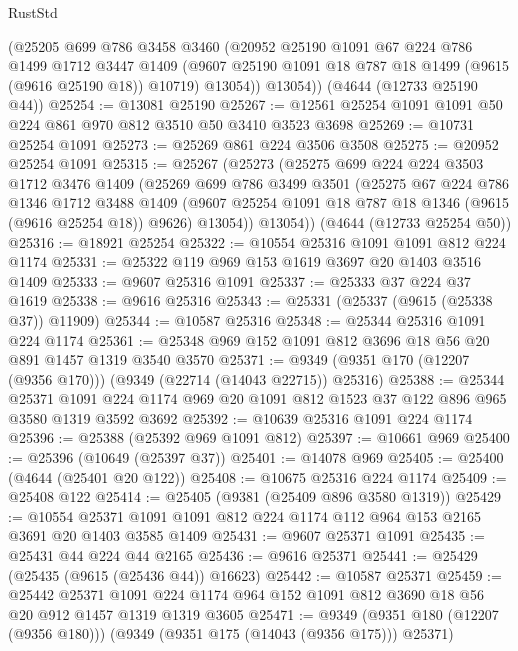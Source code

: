 \begin{lexlean}{RustStd}
\begin{coremodule}
        (@25205
          @699
          @786
          @3458
          @3460
          (@20952
            @25190
            @1091
            @67
            @224
            @786
            @1499
            @1712
            @3447
            @1409
            (@9607 @25190 @1091 @18 @787 @18 @1499 (@9615 (@9616 @25190 @18)) @10719)
            @13054))
        @13054))
    (@4644 (@12733 @25190 @44))
@25254 := @13081 @25190
@25267 := @12561 @25254 @1091 @1091 @50 @224 @861 @970 @812 @3510 @50 @3410 @3523 @3698
@25269 := @10731 @25254 @1091
@25273 := @25269 @861 @224 @3506 @3508
@25275 := @20952 @25254 @1091
@25315 := @25267
    (@25273
      (@25275
        @699
        @224
        @224
        @3503
        @1712
        @3476
        @1409
        (@25269
          @699
          @786
          @3499
          @3501
          (@25275
            @67
            @224
            @786
            @1346
            @1712
            @3488
            @1409
            (@9607 @25254 @1091 @18 @787 @18 @1346 (@9615 (@9616 @25254 @18)) @9626)
            @13054))
        @13054))
    (@4644 (@12733 @25254 @50))
@25316 := @18921 @25254
@25322 := @10554 @25316 @1091 @1091 @812 @224 @1174
@25331 := @25322 @119 @969 @153 @1619 @3697 @20 @1403 @3516 @1409
@25333 := @9607 @25316 @1091
@25337 := @25333 @37 @224 @37 @1619
@25338 := @9616 @25316
@25343 := @25331 (@25337 (@9615 (@25338 @37)) @11909)
@25344 := @10587 @25316
@25348 := @25344 @25316 @1091 @224 @1174
@25361 := @25348 @969 @152 @1091 @812 @3696 @18 @56 @20 @891 @1457 @1319 @3540 @3570
@25371 := @9349 (@9351 @170 (@12207 (@9356 @170))) (@9349 (@22714 (@14043 @22715)) @25316)
@25388 := @25344
    @25371
    @1091
    @224
    @1174
    @969
    @20
    @1091
    @812
    @1523
    @37
    @122
    @896
    @965
    @3580
    @1319
    @3592
    @3692
@25392 := @10639 @25316 @1091 @224 @1174
@25396 := @25388 (@25392 @969 @1091 @812)
@25397 := @10661 @969
@25400 := @25396 (@10649 (@25397 @37))
@25401 := @14078 @969
@25405 := @25400 (@4644 (@25401 @20 @122))
@25408 := @10675 @25316 @224 @1174
@25409 := @25408 @122
@25414 := @25405 (@9381 (@25409 @896 @3580 @1319))
@25429 := @10554 @25371 @1091 @1091 @812 @224 @1174 @112 @964 @153 @2165 @3691 @20 @1403 @3585 @1409
@25431 := @9607 @25371 @1091
@25435 := @25431 @44 @224 @44 @2165
@25436 := @9616 @25371
@25441 := @25429 (@25435 (@9615 (@25436 @44)) @16623)
@25442 := @10587 @25371
@25459 := @25442
    @25371
    @1091
    @224
    @1174
    @964
    @152
    @1091
    @812
    @3690
    @18
    @56
    @20
    @912
    @1457
    @1319
    @1319
    @3605
@25471 := @9349 (@9351 @180 (@12207 (@9356 @180))) (@9349 (@9351 @175 (@14043 (@9356 @175))) @25371)

\end{coremodule}
\end{lexlean}
